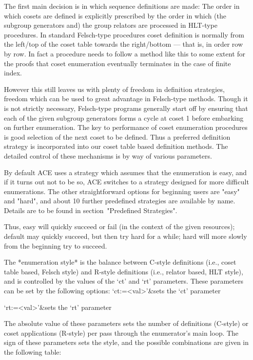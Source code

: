 The first main decision is in which sequence definitions are made:
The order in which cosets are defined is explicitly prescribed by the order
in which (the subgroup generators and) the group
relators are processed in HLT-type procedures. In standard
Felsch-type procedures coset definition is normally from the left/top
of the coset table towards the right/bottom --- that is, in order row by row. 
In fact a procedure needs to follow a method like this to some extent for 
the proofs that coset enumeration eventually terminates in the case of 
finite index.

However this still leaves us with plenty of freedom in definition
strategies, freedom which can be used to great advantage in Felsch-type
methods. Though it is not strictly necessary, Felsch-type programs generally
start off by ensuring that each of the given subgroup generators
forms a cycle at coset 1 before embarking on further enumeration.
The key to performance of coset enumeration procedures is 
good selection of the  next coset to be defined. Thus a preferred
definition strategy is incorporated into our coset table based
definition methods. The detailed control of these mechanisms
is by way of various parameters.

By default ACE uses a strategy which assumes that the enumeration is
easy, and if it turns out not to be so, ACE switches to a strategy
designed for more difficult enumerations. The other straightforward
options for beginning users are "easy" and "hard", and about 10
further predefined strategies are available by name. Details are
to be found in section~"Predefined Strategies".

Thus, easy will quickly succeed or fail (in the context of the
given resources); default may quickly succeed, but then try hard
for a while; hard will more slowly from the beginning try to succeed.

The *enumeration style* is the balance between C-style definitions (i.e.,
coset table based, Felsch style) and R-style definitions (i.e., relator
based, HLT style), and is controlled by the values of the `ct' and `rt'
parameters. These parameters can be set by the following options:
\beginitems
`ct:=<val>'&sets the `ct' parameter

`rt:=<val>'&sets the `rt' parameter
\enditems

The absolute value of these parameters sets the number of
definitions (C-style) or coset applications (R-style) per pass through the
enumerator's main loop.  The sign of these parameters sets the style, and
the possible combinations are given in the following table:

